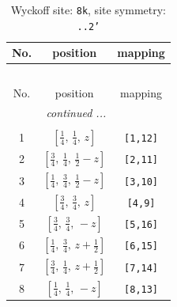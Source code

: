 \documentclass[fleqn,8pt]{jsarticle}
\begin{document}
\begin{longtable}{ccc}
\caption{Wyckoff site: {\tt 8k}, site symmetry: {\tt ..2'}}
 \\
 \hline \hline
No. & position & mapping \\ \hline \endfirsthead

\multicolumn{2}{l}{\tablename\ \thetable{}} \\
 \hline \hline
No. & position & mapping \\ \hline \endhead

 \hline \hline
\multicolumn{2}{r}{\footnotesize\it continued ...} \\ \endfoot

 \hline \hline
\multicolumn{2}{r}{} \\ \endlastfoot

1 & $\left[ \frac{1}{4},\, \frac{1}{4},\, z \right]$ & {\tt [1,12]} \\ \hline
2 & $\left[ \frac{3}{4},\, \frac{1}{4},\, \frac{1}{2} - z \right]$ & {\tt [2,11]} \\ \hline
3 & $\left[ \frac{1}{4},\, \frac{3}{4},\, \frac{1}{2} - z \right]$ & {\tt [3,10]} \\ \hline
4 & $\left[ \frac{3}{4},\, \frac{3}{4},\, z \right]$ & {\tt [4,9]} \\ \hline
5 & $\left[ \frac{3}{4},\, \frac{3}{4},\, - z \right]$ & {\tt [5,16]} \\ \hline
6 & $\left[ \frac{1}{4},\, \frac{3}{4},\, z + \frac{1}{2} \right]$ & {\tt [6,15]} \\ \hline
7 & $\left[ \frac{3}{4},\, \frac{1}{4},\, z + \frac{1}{2} \right]$ & {\tt [7,14]} \\ \hline
8 & $\left[ \frac{1}{4},\, \frac{1}{4},\, - z \right]$ & {\tt [8,13]} \\
\end{longtable}
\renewcommand{\arraystretch}{1.2}
\end{document}
